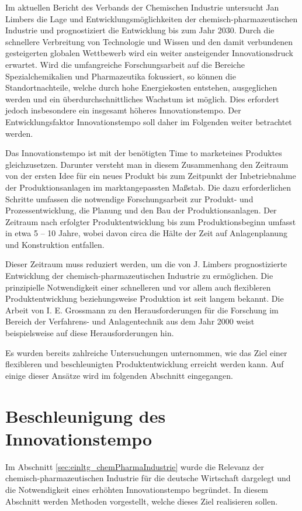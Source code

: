 Im aktuellen Bericht des Verbands der Chemischen Industrie  untersucht Jan Limbers die Lage und Entwicklungsm\"oglichkeiten der chemisch-pharmazeutischen Industrie und prognostiziert die Entwicklung bis zum Jahr 2030. Durch die schnellere Verbreitung von Technologie und Wissen und den damit verbundenen gesteigerten globalen Wettbewerb wird ein weiter ansteigender Innovationsdruck erwartet. Wird die umfangreiche Forschungsarbeit auf die Bereiche Spezialchemikalien und Pharmazeutika fokussiert, so k\"onnen die Standortnachteile, welche durch hohe Energiekosten entstehen, ausgeglichen werden und ein \"uberdurchschnittliches Wachstum ist m\"oglich. Dies erfordert jedoch insbesondere ein insgesamt h\"oheres Innovationstempo. Der Entwicklungsfaktor Innovationstempo soll daher im Folgenden weiter betrachtet werden. \cite{PerspektiveC_2016}

Das Innovationstempo ist mit der ben\"otigten \glqq Time to market\grqq { }eines Produktes gleichzusetzen. Darunter versteht man in diesem Zusammenhang den Zeitraum von der ersten Idee f\"ur ein neues Produkt bis zum Zeitpunkt der Inbetriebnahme der Produktionsanlagen im marktangepassten Ma\ss{}stab. Die dazu erforderlichen Schritte umfassen die notwendige Forschungsarbeit zur Produkt- und Prozessentwicklung, die Planung und den Bau der Produktionsanlagen. Der Zeitraum nach erfolgter Produktentwicklung bis zum Produktionsbeginn umfasst in etwa 5 -- 10 Jahre, wobei davon circa die H\"alte der Zeit auf Anlagenplanung und Konstruktion entfallen. \cite{Schembecker_2009}

Dieser Zeitraum muss reduziert werden, um die von J. Limbers prognostizierte Entwicklung der chemisch-pharmazeutischen Industrie zu erm\"oglichen. \linebreak
Die prinzipielle Notwendigkeit einer schnelleren und vor allem auch flexibleren Produktentwicklung beziehungsweise Produktion ist seit langem bekannt. Die Arbeit von I. E. Grossmann zu den Herausforderungen f\"ur die Forschung im Bereich der Verfahrens- und Anlagentechnik aus dem Jahr 2000 weist beispielsweise auf diese Herausforderungen hin. \cite{Grossmann_2000}

Es wurden bereits zahlreiche Untersuchungen unternommen, wie das Ziel einer flexibleren und  beschleunigten Produktentwicklung erreicht werden kann. Auf einige dieser Ans\"atze wird im folgenden Abschnitt eingegangen. 

\section{Beschleunigung des Innovationstempo}\label{sec:einltg_beschlngInnovationstempo}
Im Abschnitt \ref{sec:einltg_chemPharmaIndustrie} wurde die Relevanz der chemisch-pharmazeutischen Industrie f\"ur die deutsche Wirtschaft dargelegt und die Notwendigkeit eines erh\"ohten Innovationstempo begr\"undet. In diesem Abschnitt werden Methoden vorgestellt, welche dieses Ziel realisieren sollen.

